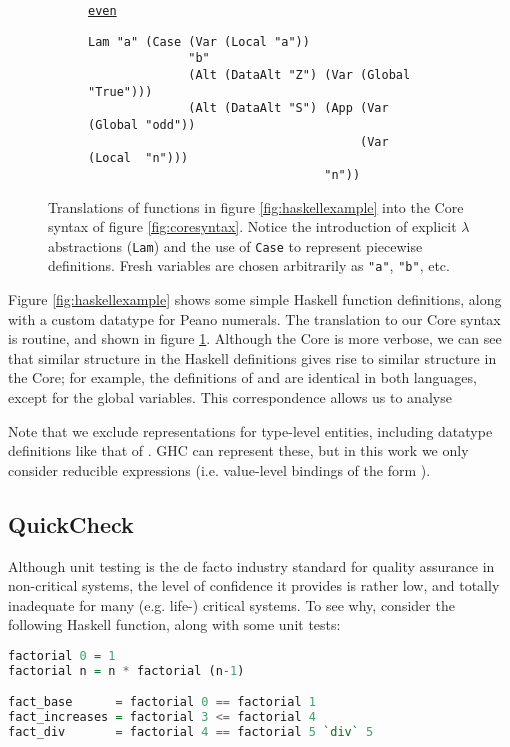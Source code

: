 \begin{figure}
\begin{subfigure}[even]{\textwidth}
    \begin{small}
      \underline{\texttt{even}}
      \begin{verbatim}
Lam "a" (Case (Var (Local "a"))
              "b"
              (Alt (DataAlt "Z") (Var (Global "True")))
              (Alt (DataAlt "S") (App (Var (Global "odd"))
                                      (Var (Local  "n")))
                                 "n"))
      \end{verbatim}
    \end{small}
  \end{subfigure}
  \caption{Translations of functions in figure \ref{fig:haskellexample} into the Core syntax of figure \ref{fig:coresyntax}. Notice the introduction of explicit $\lambda$ abstractions (\texttt{Lam}) and the use of \texttt{Case} to represent piecewise definitions. Fresh variables are chosen arbitrarily as \texttt{"a"}, \texttt{"b"}, etc.}
  \label{fig:coreexample}
\end{figure}

Figure \ref{fig:haskellexample} shows some simple Haskell function definitions, along with a custom datatype for Peano numerals. The translation to our Core syntax is routine, and shown in figure \ref{fig:coreexample}. Although the Core is more verbose, we can see that similar structure in the Haskell definitions gives rise to similar structure in the Core; for example, the definitions of  and  are identical in both languages, except for the global variables. This correspondence allows us to analyse

Note that we exclude representations for type-level entities, including datatype definitions like that of . GHC can represent these, but in this work we only consider reducible expressions (i.e. value-level bindings of the form ).

\subsection{QuickCheck}
\label{sec:quickcheck}

Although unit testing is the de facto industry standard for quality assurance in non-critical systems, the level of confidence it provides is rather low, and totally inadequate for many (e.g. life-) critical systems. To see why, consider the following Haskell function, along with some unit tests:

\begin{lstlisting}[language=Haskell, xleftmargin=.2\textwidth, xrightmargin=.2\textwidth]
factorial 0 = 1
factorial n = n * factorial (n-1)

fact_base      = factorial 0 == factorial 1
fact_increases = factorial 3 <= factorial 4
fact_div       = factorial 4 == factorial 5 `div` 5
\end{lstlisting}


